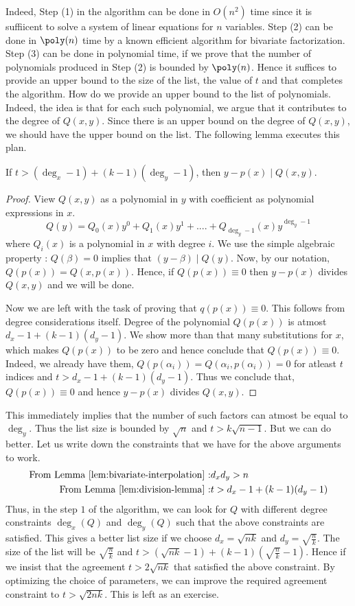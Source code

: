 Indeed, Step (1) in the algorithm can be done in $O(n^2)$ time since it is suffiicent to solve a system of linear equations for $n$ variables. Step (2) can be done in $\poly(n)$ time by a known efficient algorithm for bivariate factorization. Step (3) can be done in polynomial time, if we prove that the number of polynomials produced in Step (2) is bounded by $\poly(n)$. Hence it suffices to provide an upper bound to the size of the list, the value of $t$ and that completes the algorithm. How do we provide an upper bound to the list of polynomials. Indeed, the idea is that for each such polynomial, we argue that it contributes to the degree of $Q(x,y)$. Since there is an upper bound on the degree of $Q(x,y)$, we should have the upper bound on the list. The following lemma executes this plan.

\begin{lemma}
\label{lem:division-lemma}
 If $t > (\deg_x-1)+(k-1)(\deg_y-1)$, then $y-p(x) \mid Q(x,y)$.
\end{lemma}
\begin{proof}
View $Q(x,y)$ as a polynomial in $y$ with coefficient as polynomial expressions in $x$. 
$$Q(y) = Q_0(x)y^0+Q_1(x)y^1+....+Q_{\deg_y-1}(x)y^{\deg_y-1}$$
where $Q_i(x)$ is a polynomial in $x$ with degree $i$.
We use the simple algebraic property :
$Q(\beta) = 0$ implies that $(y-\beta) \mid Q(y)$.
Now, by our notation, $Q(p(x)) = Q(x,p(x))$. Hence, if $Q(p(x)) \equiv 0$ then $y-p(x)$ divides $Q(x,y)$ and we will be done.

Now we are left with the task of proving that $q(p(x)) \equiv 0$. This follows from degree considerations itself. 
Degree of the polynomial $Q(p(x))$ is atmost $d_x-1+(k-1)(d_y-1)$.
We show more than that many substitutions for $x$, which makes $Q(p(x))$ to be zero and hence conclude that $Q(p(x)) \equiv 0$.
Indeed, we already have them, $Q(p(\alpha_i)) = Q(\alpha_i,p(\alpha_i)) = 0$  for atleast $t$ indices and $t > d_x-1+(k-1)(d_y-1)$. Thus we conclude that, $Q(p(x)) \equiv 0$ and hence $y-p(x)$ divides $Q(x,y)$.
\end{proof}

This immediately implies that the number of such factors can atmost be equal to $\deg_y$. Thus the list size is bounded by $\sqrt{n}$ and $t > k\sqrt{n-1}$. But we can do better. Let us write down the constraints that we have for the above arguments to work.
\begin{eqnarray*}
\textrm{From Lemma~\ref{lem:bivariate-interpolation} :} & d_xd_y > n\\
\textrm{From Lemma~\ref{lem:division-lemma} :} & t > d_x-1+(k-1)(d_y-1)
\end{eqnarray*}
Thus, in the step $1$ of the algorithm, we can look for $Q$ with different degree constraints $\deg_x(Q)$ and $\deg_y(Q)$ such that the above constraints are satisfied. This gives a better list size if we choose $d_x = \sqrt{nk}$ and $d_y = \sqrt{\frac{n}{k}}$. The size of the list will be $\sqrt{\frac{n}{k}}$ and 
$t > (\sqrt{nk}-1) + (k-1)(\sqrt{\frac{n}{k}}-1)$. Hence if we insist that the agreement $t > 2\sqrt{nk}$ that satisfied the above constraint. By optimizing the choice of parameters, we can improve the required agreement constraint to $t >\sqrt{2nk}$. This is left as an exercise.

